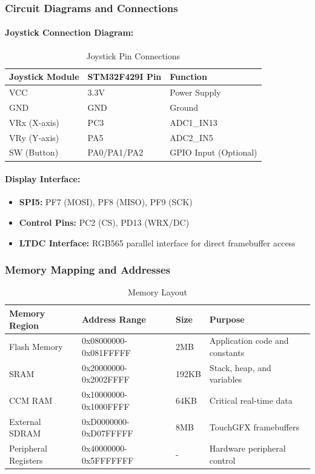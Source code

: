 \documentclass[12pt,a4paper]{article}
\begin{document}
\subsubsection{Circuit Diagrams and Connections}

\paragraph{Joystick Connection Diagram:}

\begin{table}[H]
\centering
\caption{Joystick Pin Connections}
\label{tab:joystick_pins}
\begin{tabular}{|l|l|l|}
\hline
\textbf{Joystick Module} & \textbf{STM32F429I Pin} & \textbf{Function} \\
\hline
VCC & 3.3V & Power Supply \\
\hline
GND & GND & Ground \\
\hline
VRx (X-axis) & PC3 & ADC1\_IN13 \\
\hline
VRy (Y-axis) & PA5 & ADC2\_IN5 \\
\hline
SW (Button) & PA0/PA1/PA2 & GPIO Input (Optional) \\
\hline
\end{tabular}
\end{table}

\paragraph{Display Interface:}
\begin{itemize}[leftmargin=*]
    \item \textbf{SPI5:} PF7 (MOSI), PF8 (MISO), PF9 (SCK)
    \item \textbf{Control Pins:} PC2 (CS), PD13 (WRX/DC)
    \item \textbf{LTDC Interface:} RGB565 parallel interface for direct framebuffer access
\end{itemize}

\subsubsection{Memory Mapping and Addresses}

\begin{table}[H]
\centering
\caption{Memory Layout}
\label{tab:memory_map}
\begin{tabular}{|l|l|l|l|}
\hline
\textbf{Memory Region} & \textbf{Address Range} & \textbf{Size} & \textbf{Purpose} \\
\hline
Flash Memory & 0x08000000-0x081FFFFF & 2MB & Application code and constants \\
\hline
SRAM & 0x20000000-0x2002FFFF & 192KB & Stack, heap, and variables \\
\hline
CCM RAM & 0x10000000-0x1000FFFF & 64KB & Critical real-time data \\
\hline
External SDRAM & 0xD0000000-0xD07FFFFF & 8MB & TouchGFX framebuffers \\
\hline
Peripheral Registers & 0x40000000-0x5FFFFFFF & - & Hardware peripheral control \\
\hline
\end{tabular}
\end{table}
\end{document}
